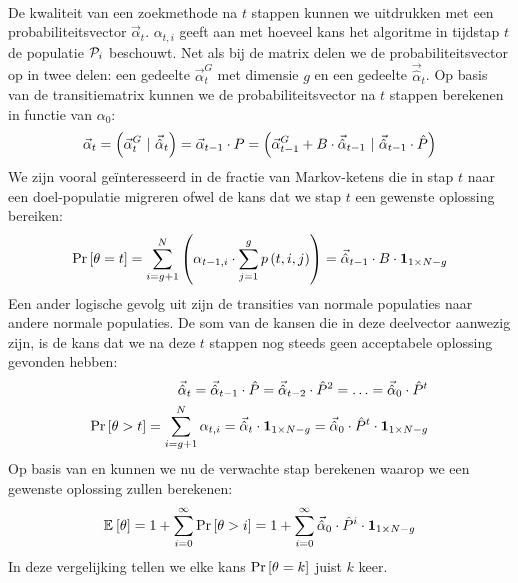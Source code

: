 \paragraph{}
De kwaliteit van een zoekmethode na $t$ stappen kunnen we uitdrukken met een probabiliteitsvector $\vec{\alpha}_t$. $\alpha_{t,i}$ geeft aan met hoeveel kans het algoritme in tijdstap $t$ de populatie $\mathcal{P}_i$ beschouwt. Net als bij de matrix delen we de probabiliteitsvector op in twee delen: een gedeelte $\vec{\alpha}^G_t$ met dimensie $g$ en een gedeelte $\vec{\hat{\alpha}}_t$. Op basis van de transitiematrix kunnen we de probabiliteitsvector na $t$ stappen berekenen in functie van $\alpha_0$:
\begin{equation}
\vec{\alpha}_t=\brak{\vec{\alpha}_t^G\ |\ \vec{\hat{\alpha}}_t}=\vec{\alpha}_{t-1}\cdot P=\brak{\vec{\alpha}_{t-1}^G+B\cdot\vec{\hat{\alpha}}_{t-1}\ |\ \vec{\hat{\alpha}}_{t-1}\cdot\hat{P}}
\eqnlab{oneStepTransition}
\end{equation}
We zijn vooral ge\"interesseerd in de fractie van Markov-ketens die in stap $t$ naar een doel-populatie migreren ofwel de kans dat we stap $t$ een gewenste oplossing bereiken:
\begin{equation}
\Prob{\theta=t}=\displaystyle\sum_{i=g+1}^{N}\brak{\alpha_{t-1,i}\cdot\displaystyle\sum_{j=1}^{g}\fun{p}{t,i,j}}=\vec{\hat{\alpha}}_{t-1}\cdot B\cdot\onematrix[1\times N-g]
\eqnlab{exhaust}
\end{equation}
Een ander logische gevolg uit  zijn de transities van normale populaties naar andere normale populaties. De som van de kansen die in deze deelvector aanwezig zijn, is de kans dat we na deze $t$ stappen nog steeds geen acceptabele oplossing gevonden hebben:
\begin{eqnarray}
\vec{\hat{\alpha}}_t=\vec{\hat{\alpha}}_{t-1}\cdot\hat{P}=\vec{\hat{\alpha}}_{t-2}\cdot\hat{P}^2=\ldots=\vec{\hat{\alpha}}_{0}\cdot\hat{P}^t\eqnlab{remainder}\\
\Prob{\theta>t}=\displaystyle\sum_{i=g+1}^{N}\alpha_{t,i}=\vec{\hat{\alpha}}_t\cdot\onematrix[1\times N-g]=\vec{\hat{\alpha}}_{0}\cdot\hat{P}^t\cdot\onematrix[1\times N-g]\eqnlab{nothit}
\end{eqnarray}
Op basis van  en  kunnen we nu de verwachte stap berekenen waarop we een gewenste oplossing zullen berekenen:
\begin{equation}
\mean{\theta}=1+\displaystyle\sum_{i=0}^{\infty}{\Prob{\theta>i}}=1+\displaystyle\sum_{i=0}^{\infty}{\vec{\hat{\alpha}}_{0}\cdot\hat{P}^i\cdot\onematrix[1\times N-g]}
\eqnlab{meanHit}
\end{equation}
In deze vergelijking tellen we elke kans $\Pr\left[\theta=k\right]$ juist $k$ keer.
